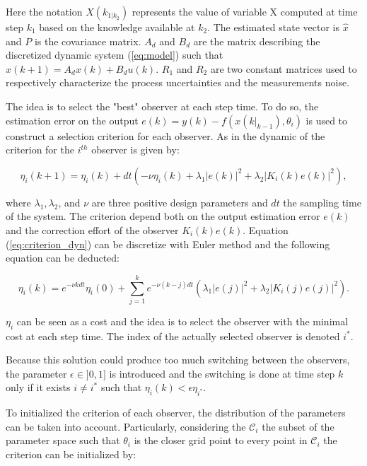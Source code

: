 Here the notation $X(k_{1|k_2})$ represents the value of variable X computed at time step $k_1$ based on the knowledge available at $k_2$. The estimated state vector is $\hat{x}$ and $P$ is the covariance matrix. $A_d$ and $B_d$ are the matrix describing the discretized dynamic system (\ref{eq:model}) such that $x(k+1) = A_dx(k) + B_d u(k)$. $R_1$ and $R_2$ are two constant matrices used to respectively characterize the process uncertainties and the measurements noise.
\medskip


The idea is to select the "best" observer at each step time. To do so, the estimation error on the output $e(k) = y(k) - f(x(k|_{k-1}), \theta_i)$ is used to construct a selection criterion for each observer. As in \cite{petriImprovingEstimationPerformance2022} the dynamic of the criterion for the $i^{th}$ observer is given by:

\begin{equation}
\eta_i (k+1) = \eta_i (k) + dt \left(- \nu \eta_i(k) + \lambda_1 |e(k)|^2 + \lambda_2 |K_i(k) e(k)|^2 \right),
\label{eq:criterion_dyn}
\end{equation}

where $\lambda_1, \lambda_2$, and $\nu$ are three positive design parameters and $dt$ the sampling time of the system. The criterion depend both on the output estimation error $e(k)$ and the correction effort of the observer $K_i(k) e(k)$. Equation (\ref{eq:criterion_dyn}) can be discretize with Euler method and the following equation can be deducted:

\begin{equation}
\eta_i(k) = e^{-\nu k dt} \eta_i(0) + \sum_{j=1}^{k} e^{-\nu(k-j)dt} (\lambda_1 |e(j)|^2 + \lambda_2 |K_i(j) e(j)|^2 ).
\end{equation} 

$\eta_i$ can be seen as a cost and the idea is to select the observer with the minimal cost at each step time. The index of the actually selected observer is denoted $i^*$.

\medskip
Because this solution could produce too much switching between the observers, the parameter $\epsilon \in ]0,1]$ is introduced and the switching is done at time step $k$ only if it exists $i\neq i^*$ such that $\eta_i(k)<\epsilon \eta_{i^*}$.
\medskip

To initialized the criterion of each observer, the distribution of the parameters can be taken into account. Particularly, considering the $\mathcal{C}_i$ the subset of the parameter space such that $\theta_i$ is the closer grid point to every point in $\mathcal{C}_i$ the criterion can be initialized by:

